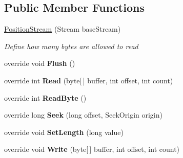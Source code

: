 \subsection*{Public Member Functions}
\begin{DoxyCompactItemize}
\item 
\hyperlink{class_silent_orbit_1_1_protocol_buffers_1_1_position_stream_ab13f95fb3f0983f82388afb9bb1c013c}{Position\+Stream} (Stream base\+Stream)
\begin{DoxyCompactList}\small\item\em Define how many bytes are allowed to read \end{DoxyCompactList}\item 
override void {\bfseries Flush} ()\hypertarget{class_silent_orbit_1_1_protocol_buffers_1_1_position_stream_a6d7ebc2f64c2ca0082999b789e212b34}{}\label{class_silent_orbit_1_1_protocol_buffers_1_1_position_stream_a6d7ebc2f64c2ca0082999b789e212b34}

\item 
override int {\bfseries Read} (byte\mbox{[}$\,$\mbox{]} buffer, int offset, int count)\hypertarget{class_silent_orbit_1_1_protocol_buffers_1_1_position_stream_a27fc475b69fe19b99f006e60b7014dad}{}\label{class_silent_orbit_1_1_protocol_buffers_1_1_position_stream_a27fc475b69fe19b99f006e60b7014dad}

\item 
override int {\bfseries Read\+Byte} ()\hypertarget{class_silent_orbit_1_1_protocol_buffers_1_1_position_stream_aea646d55f92a44b21539362b8aa10a1e}{}\label{class_silent_orbit_1_1_protocol_buffers_1_1_position_stream_aea646d55f92a44b21539362b8aa10a1e}

\item 
override long {\bfseries Seek} (long offset, Seek\+Origin origin)\hypertarget{class_silent_orbit_1_1_protocol_buffers_1_1_position_stream_abf4fc317b09470675d7590be0006c60c}{}\label{class_silent_orbit_1_1_protocol_buffers_1_1_position_stream_abf4fc317b09470675d7590be0006c60c}

\item 
override void {\bfseries Set\+Length} (long value)\hypertarget{class_silent_orbit_1_1_protocol_buffers_1_1_position_stream_a1426c80a536ff433af9000a9b230fe88}{}\label{class_silent_orbit_1_1_protocol_buffers_1_1_position_stream_a1426c80a536ff433af9000a9b230fe88}

\item 
override void {\bfseries Write} (byte\mbox{[}$\,$\mbox{]} buffer, int offset, int count)\hypertarget{class_silent_orbit_1_1_protocol_buffers_1_1_position_stream_a8d3b71fb0c9d731b928ca1d597fdbd97}{}\label{class_silent_orbit_1_1_protocol_buffers_1_1_position_stream_a8d3b71fb0c9d731b928ca1d597fdbd97}


\end{DoxyCompactItemize}
